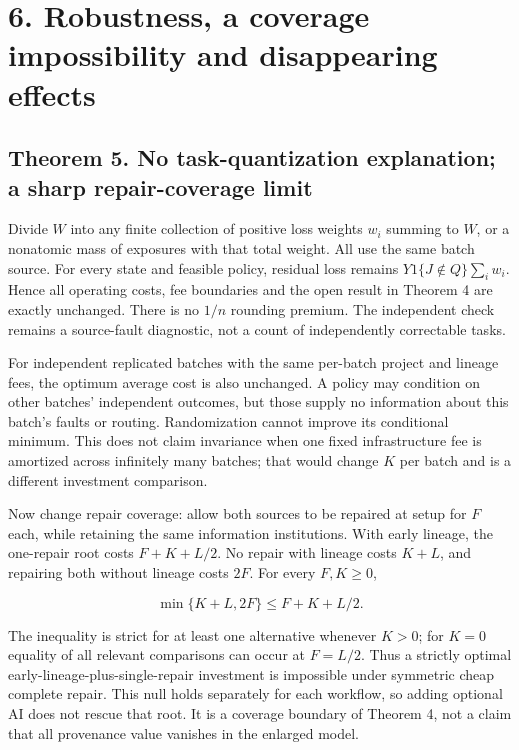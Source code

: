 \documentclass[
  11pt,
  a4paper,
]{article}
\begin{document}
\section{6. Robustness, a coverage impossibility and disappearing
effects}\label{robustness-a-coverage-impossibility-and-disappearing-effects}

\subsection{Theorem 5. No task-quantization explanation; a sharp
repair-coverage
limit}\label{theorem-5.-no-task-quantization-explanation-a-sharp-repair-coverage-limit}

Divide \(W\) into any finite collection of positive loss weights \(w_i\)
summing to \(W\), or a nonatomic mass of exposures with that total
weight. All use the same batch source. For every state and feasible
policy, residual loss remains \(Y1\{J\notin Q\}\sum_iw_i\). Hence all
operating costs, fee boundaries and the open result in Theorem 4 are
exactly unchanged. There is no \(1/n\) rounding premium. The independent
check remains a source-fault diagnostic, not a count of independently
correctable tasks.

For independent replicated batches with the same per-batch project and
lineage fees, the optimum average cost is also unchanged. A policy may
condition on other batches' independent outcomes, but those supply no
information about this batch's faults or routing. Randomization cannot
improve its conditional minimum. This does not claim invariance when one
fixed infrastructure fee is amortized across infinitely many batches;
that would change \(K\) per batch and is a different investment
comparison.

Now change repair coverage: allow both sources to be repaired at setup
for \(F\) each, while retaining the same information institutions. With
early lineage, the one-repair root costs \(F+K+L/2\). No repair with
lineage costs \(K+L\), and repairing both without lineage costs \(2F\).
For every \(F,K\geq0\),

\[\min\{K+L,2F\}\leq F+K+L/2.\tag{16}\]

The inequality is strict for at least one alternative whenever \(K>0\);
for \(K=0\) equality of all relevant comparisons can occur at \(F=L/2\).
Thus a strictly optimal early-lineage-plus-single-repair investment is
impossible under symmetric cheap complete repair. This null holds
separately for each workflow, so adding optional AI does not rescue that
root. It is a coverage boundary of Theorem 4, not a claim that all
provenance value vanishes in the enlarged model.
\end{document}
